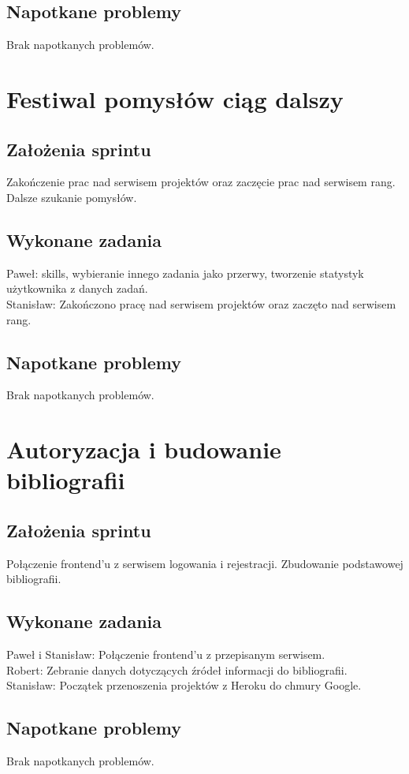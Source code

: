 \documentclass[a4paper,11pt]{report}
\begin{document}
\subsection {Napotkane problemy}
Brak napotkanych problemów.

\section {Festiwal pomysłów ciąg dalszy}
\subsection {Założenia sprintu}
Zakończenie prac nad serwisem projektów oraz zaczęcie prac nad serwisem rang. Dalsze szukanie pomysłów.
\subsection {Wykonane zadania}
Paweł: skills, wybieranie innego zadania jako przerwy, tworzenie statystyk użytkownika z danych zadań.\\
Stanisław: Zakończono pracę nad serwisem projektów oraz zaczęto nad serwisem rang.\\
\subsection {Napotkane problemy}
Brak napotkanych problemów.

\section {Autoryzacja i budowanie bibliografii}
\subsection {Założenia sprintu}
Połączenie frontend'u z serwisem logowania i rejestracji. Zbudowanie podstawowej bibliografii.
\subsection {Wykonane zadania}
Paweł i Stanisław: Połączenie frontend'u z przepisanym serwisem.\\
Robert: Zebranie danych dotyczących źródeł informacji do bibliografii.\\
Stanisław: Początek przenoszenia projektów z Heroku do chmury Google.\\
\subsection {Napotkane problemy}
Brak napotkanych problemów.
\end{document}
